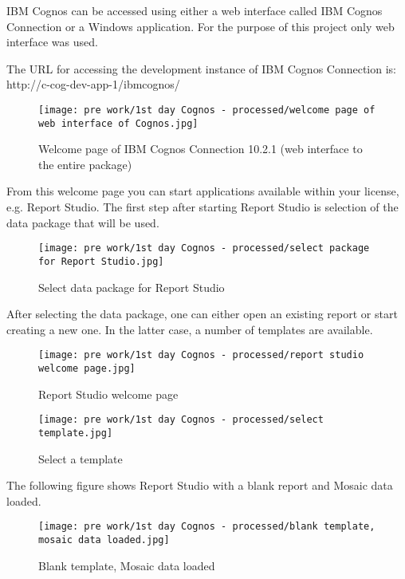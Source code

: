 IBM Cognos can be accessed using either a web interface called IBM Cognos Connection or a Windows application. For the purpose of this project only web interface was used.

The URL for accessing the development instance of IBM Cognos Connection is:\\
http://c-cog-dev-app-1/ibmcognos/

\begin{figure}[hp]
\centering
     \texttt{[image: pre work/1st day Cognos - processed/welcome page of web interface of Cognos.jpg]}
      \caption{Welcome page of IBM Cognos Connection 10.2.1 (web interface to the entire package)}
       \label{normal_case}
\end{figure}

From this welcome page you can start applications available within your license, e.g. Report Studio. The first step after starting Report Studio is selection of the data package that will be used.

\begin{figure}[hp]
\centering
     \texttt{[image: pre work/1st day Cognos - processed/select package for Report Studio.jpg]}
      \caption{Select data package for Report Studio}
       \label{normal_case}
\end{figure}

After selecting the data package, one can either open an existing report or start creating a new one. In the latter case, a number of templates are available.

\begin{figure}[hp]
\centering
     \texttt{[image: pre work/1st day Cognos - processed/report studio welcome page.jpg]}
      \caption{Report Studio welcome page}
       \label{normal_case}
\end{figure}

\begin{figure}[hp]
\centering
     \texttt{[image: pre work/1st day Cognos - processed/select template.jpg]}
      \caption{Select a template}
       \label{normal_case}
\end{figure}

The following figure shows Report Studio with a blank report and Mosaic data loaded.

\begin{figure}[hp]
\centering
     \texttt{[image: pre work/1st day Cognos - processed/blank template, mosaic data loaded.jpg]}
      \caption{Blank template, Mosaic data loaded}
       \label{normal_case}
\end{figure}

